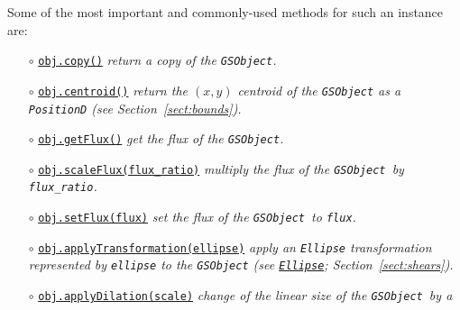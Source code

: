 \documentclass[preprint,11pt]{aastex}
\begin{document}
Some of the most important and commonly-used methods for such an
instance are:
\begin{itemize}
\item[$\circ$]
  \href{http://galsim-developers.github.com/GalSim/classgalsim_1_1base_1_1_g_s_object.html#aa0b398d4b0fca70211e4a73f81ea7e1a}{\texttt{obj.copy()}}
  \newline \emph{return a copy of the \texttt{GSObject}.}
\item[$\circ$]
  \href{http://galsim-developers.github.com/GalSim/classgalsim_1_1base_1_1_g_s_object.html#a662d8ce421ecd90080bdcaaf6890aed8}{\texttt{obj.centroid()}}
  \newline \emph{return the $(x, y)$ centroid of the \texttt{GSObject} as a
    \texttt{PositionD} (see Section~\ref{sect:bounds}).}
\item[$\circ$]
  \href{http://galsim-developers.github.com/GalSim/classgalsim_1_1base_1_1_g_s_object.html#a662d8ce421ecd90080bdcaaf6890aed8}{\texttt{obj.getFlux()}}
  \newline \emph{get the flux of the \texttt{GSObject}.}
\item[$\circ$]\href{http://galsim-developers.github.com/GalSim/classgalsim_1_1base_1_1_g_s_object.html#af4193645a9af52e7d54a044cafec8ab9}{\texttt{obj.scaleFlux(flux\_ratio)}}
  \newline \emph{multiply the flux of the \texttt{GSObject}~by \texttt{flux\_ratio}.}
\item[$\circ$]
  \href{http://galsim-developers.github.com/GalSim/classgalsim_1_1base_1_1_g_s_object.html#a1993652591ddc802b734186391b28894}{\texttt{obj.setFlux(flux)}}
    \newline \emph{set the flux of the \texttt{GSObject}~to \texttt{flux}.}
\item[$\circ$]
\href{http://galsim-developers.github.com/GalSim/classgalsim_1_1base_1_1_g_s_object.html#ad491a1276fda07b148c6466d5dbd07b1}{\texttt{obj.applyTransformation(ellipse)}}
\newline \emph{apply an \texttt{Ellipse} transformation represented by
  \texttt{ellipse} to the \texttt{GSObject} (see \href{http://galsim-developers.github.com/GalSim/classgalsim_1_1ellipse_1_1_ellipse.html}{\texttt{Ellipse}}; Section~\ref{sect:shears}).}
\item[$\circ$]
  \href{http://galsim-developers.github.com/GalSim/classgalsim_1_1base_1_1_g_s_object.html#a4301c73bbc1491ebb170e64c509cadd5}{\texttt{obj.applyDilation(scale)}}
  \newline \emph{change of the linear size of the \texttt{GSObject}~by a
}
\end{itemize}
\end{document}
